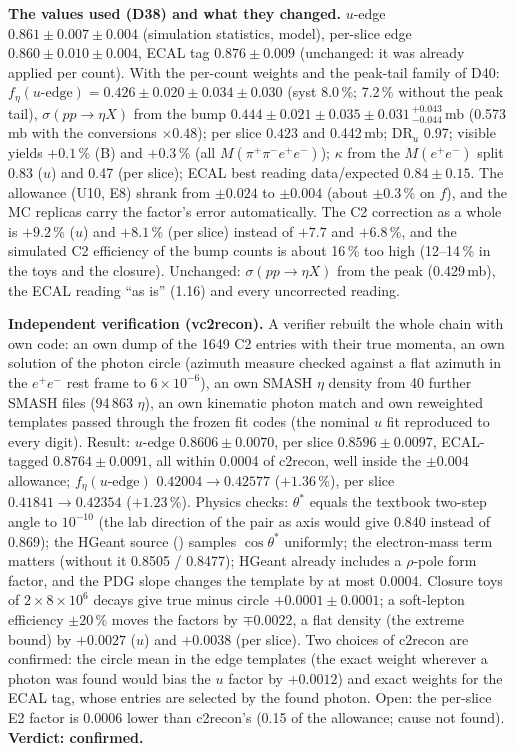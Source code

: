 \documentclass[11pt,a4paper]{article}
\newcommand{\ee}{\ensuremath{e^{+}e^{-}}\xspace}
\newcommand{\Mfour}{\ensuremath{M(\pi^{+}\pi^{-}e^{+}e^{-})}\xspace}
\newcommand{\Mee}{\ensuremath{M(e^{+}e^{-})}\xspace}
\newcommand{\code}[1]{\texttt{\detokenize{#1}}}
\newcommand{\sigeta}{\ensuremath{\sigma(pp\to\eta X)}\xspace}
\begin{document}
\textbf{The values used (D38) and what they changed.} $u$-edge $0.861\pm0.007\pm0.004$ (simulation statistics, model),
per-slice edge $0.860\pm0.010\pm0.004$, ECAL tag $0.876\pm0.009$ (unchanged: it was already applied per count). With the per-count weights and the
peak-tail family of D40: $f_\eta(u\text{-edge})=0.426\pm0.020\pm0.034\pm0.030$ (syst 8.0\,\%; 7.2\,\% without the peak tail), \sigeta from the bump
$0.444\pm0.021\pm0.035\pm0.031\,^{+0.043}_{-0.044}$\,mb (0.573\,mb with the conversions $\times0.48$); per slice $0.423$ and 0.442\,mb; DR$_u$ 0.97;
visible yields $+0.1$\,\% (B) and $+0.3$\,\% (all \Mfour); $\kappa$ from the \Mee split 0.83 ($u$) and 0.47 (per slice); ECAL best reading
data/expected $0.84\pm0.15$. The allowance (U10, E8) shrank from $\pm0.024$ to $\pm0.004$ (about $\pm0.3$\,\% on $f$), and the MC replicas carry
the factor's error automatically. The C2 correction as a whole is $+9.2$\,\% ($u$) and $+8.1$\,\% (per slice) instead of $+7.7$ and $+6.8$\,\%, and
the simulated C2 efficiency of the bump counts is about 16\,\% too high (12--14\,\% in the toys and the closure). Unchanged: \sigeta from the peak
(0.429\,mb), the ECAL reading ``as is'' (1.16) and every uncorrected reading.

\textbf{Independent verification (vc2recon).} A verifier rebuilt the whole chain with own code: an own dump of the 1649 C2 entries with their true
momenta, an own solution of the photon circle (azimuth measure checked against a flat azimuth in the \ee rest frame to $6\times10^{-6}$), an own
SMASH $\eta$ density from 40 further SMASH files (94\,863 $\eta$), an own kinematic photon match and own reweighted templates passed through the
frozen fit codes (the nominal $u$ fit reproduced to every digit). Result: $u$-edge $0.8606\pm0.0070$, per slice $0.8596\pm0.0097$, ECAL-tagged
$0.8764\pm0.0091$, all within 0.0004 of c2recon, well inside the $\pm0.004$ allowance; $f_\eta(u\text{-edge})$ $0.42004\to0.42577$ ($+1.36$\,\%),
per slice $0.41841\to0.42354$ ($+1.23$\,\%). Physics checks: $\theta^*$ equals the textbook two-step angle to $10^{-10}$ (the lab direction of the
pair as axis would give 0.840 instead of 0.869); the HGeant source (\code{gdalet.F}) samples $\cos\theta^*$ uniformly; the electron-mass term
matters (without it 0.8505 / 0.8477); HGeant already includes a $\rho$-pole form factor, and the PDG slope changes the template by at most 0.0004.
Closure toys of $2\times8\times10^6$ decays give true minus circle $+0.0001\pm0.0001$; a soft-lepton efficiency $\pm20$\,\% moves the factors by
$\mp0.0022$, a flat density (the extreme bound) by $+0.0027$ ($u$) and $+0.0038$ (per slice). Two choices of c2recon are confirmed: the circle
mean in the edge templates (the exact weight wherever a photon was found would bias the $u$ factor by $+0.0012$) and exact weights for the ECAL
tag, whose entries are selected by the found photon. Open: the per-slice E2 factor is 0.0006 lower than c2recon's (0.15 of the allowance; cause
not found). \textbf{Verdict: confirmed.}
\end{document}
